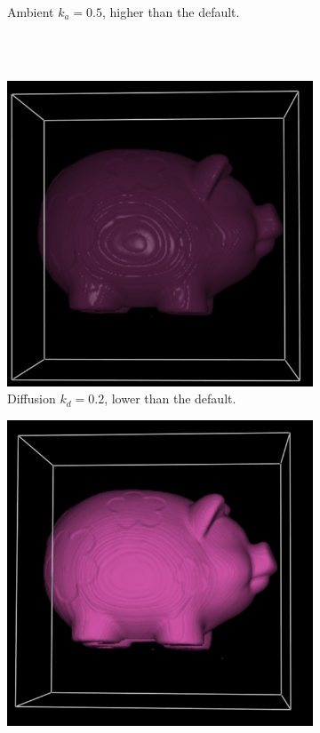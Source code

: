 \documentclass[a4paper]{article}
\begin{document}
\begin{figure}[h]
\begin{subfigure}[b]{0.45\textwidth}
    \caption{Ambient $k_a=0.5$, higher than the default.}
  \end{subfigure}
  \\~\\
  \begin{subfigure}[b]{0.45\textwidth}
    \centering
    \includegraphics[width=\textwidth]{pig8-phong-diffusion02}
    \caption{Diffusion $k_d=0.2$, lower than the default.}
  \end{subfigure}
  \hfill
  \begin{subfigure}[b]{0.45\textwidth}
    \centering
    \includegraphics[width=\textwidth]{pig8-phong-specular0}

\end{subfigure}
\end{figure}
\end{document}
